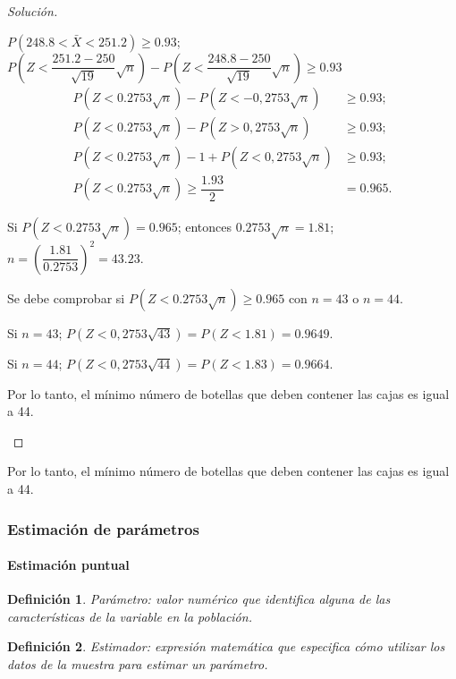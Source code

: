 \documentclass[a5paper,doc,10pt,noapacite]{apa6}
\newtheorem{definicion}{Definición}
\begin{document}
{{\begin{proof}[Solución]
\begin{APAenumerate}
		\vspace{1\baselineskip}
		\item \(P(248.8<\bar{X}<251.2)\geq 0.93\); \(P\left(Z<\dfrac{251.2-250}{\sqrt{19}}\sqrt{n}\right)-P\left(Z<\dfrac{248.8-250}{\sqrt{19}}\sqrt{n}\right)\geq 0.93\)
		\begin{align*}
			P(Z<0.2753\sqrt{n})-P(Z<-0,2753\sqrt{n})	&\geq 0.93	;
			\\
			P(Z<0.2753\sqrt{n})-P(Z>0,2753\sqrt{n})	&\geq 0.93;
			\\
			P(Z<0.2753\sqrt{n})-1+P(Z<0,2753\sqrt{n}) &\geq 0.93;
			\\
			P(Z<0.2753\sqrt{n})\geq\dfrac{1.93}{2} &=0.965.
		\end{align*}
		
		Si \(P(Z<0.2753\sqrt{n})=0.965\); entonces \(0.2753\sqrt{n}=1.81\); \(n=\left(\dfrac{1.81}{0.2753}\right)^2=43.23\).
		
		Se debe comprobar si \(P(Z<0.2753\sqrt{n})\geq 0.965\) con \(n=43\)  o \(n=44\).
		
		Si \(n=43\); \(P(Z<0,2753\sqrt{43})=P(Z<1.81)=0.9649\).
		
		Si \(n=44\); \(P(Z<0,2753\sqrt{44})=P(Z<1.83)=0.9664\).
		
		Por lo tanto, el mínimo número de botellas que deben contener las cajas es igual a 44.	\qedhere
	\end{APAenumerate}
\end{proof}

Por lo tanto, el mínimo número de botellas que deben contener las cajas es igual a 44.


\newpage

%
\subsubsection{Estimación de parámetros}

\paragraph{Estimación puntual}

	
\begin{definicion}
	Parámetro: valor numérico que identifica alguna de las características de la variable en la población.
\end{definicion}
	
\begin{definicion}
	Estimador: expresión matemática que especifica cómo utilizar los datos de la muestra para estimar un parámetro.
\end{definicion}
	
}}
\end{document}
